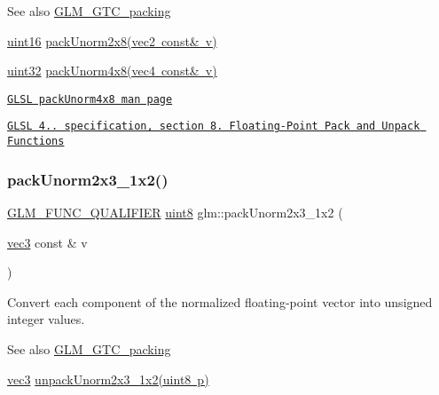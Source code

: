 \begin{DoxySeeAlso}{See also}
\mbox{\hyperlink{group__gtc__packing}{G\+L\+M\+\_\+\+G\+T\+C\+\_\+packing}} 

\mbox{\hyperlink{group__gtc__type__precision_gad8c2939e1fdd8e5828b31d95c52255d5}{uint16}} \mbox{\hyperlink{group__gtc__packing_ga833288fc0d4a79f19d0db75a6843bfe6}{pack\+Unorm2x8(vec2 const\& v)}} 

\mbox{\hyperlink{group__gtc__type__precision_ga202b6a53c105fcb7e531f9b443518451}{uint32}} \mbox{\hyperlink{group__core__func__packing_gaf7d2f7341a9eeb4a436929d6f9ad08f2}{pack\+Unorm4x8(vec4 const\& v)}} 

\href{http://www.opengl.org/sdk/docs/manglsl/xhtml/packUnorm4x8.xml}{\tt G\+L\+SL pack\+Unorm4x8 man page} 

\href{http://www.opengl.org/registry/doc/GLSLangSpec.4.20.8.pdf}{\tt G\+L\+SL 4.. specification, section 8. Floating-\/\+Point Pack and Unpack Functions} 
\end{DoxySeeAlso}
\mbox{\label{group__gtc__packing_ga0acca4eb99c300fe2edeef7ebd8fa08b}} 
\subsubsection{\texorpdfstring{pack\+Unorm2x3\+\_\+1x2()}{packUnorm2x3\_1x2()}}
{\footnotesize\ttfamily \mbox{\hyperlink{setup_8hpp_a33fdea6f91c5f834105f7415e2a64407}{G\+L\+M\+\_\+\+F\+U\+N\+C\+\_\+\+Q\+U\+A\+L\+I\+F\+I\+ER}} \mbox{\hyperlink{group__gtc__type__precision_ga1a7dcd8aac97cc8020817c94049deff2}{uint8}} glm\+::pack\+Unorm2x3\+\_\+1x2 (\begin{DoxyParamCaption}\item[{\mbox{\hyperlink{group__core__types_ga1c47e8b3386109bc992b6c48e91b0be7}{vec3}} const \&}]{v }\end{DoxyParamCaption})}

Convert each component of the normalized floating-\/point vector into unsigned integer values.

\begin{DoxySeeAlso}{See also}
\mbox{\hyperlink{group__gtc__packing}{G\+L\+M\+\_\+\+G\+T\+C\+\_\+packing}} 

\mbox{\hyperlink{group__core__types_ga1c47e8b3386109bc992b6c48e91b0be7}{vec3}} \mbox{\hyperlink{group__gtc__packing_gaeeacc5275329100c50fe8fc0871eb423}{unpack\+Unorm2x3\+\_\+1x2(uint8 p)}} 
\end{DoxySeeAlso}
\mbox{\label{group__gtc__packing_gad68eb2f848ba867192b8787998c0595a}} 
